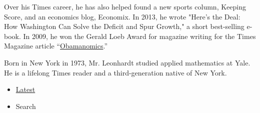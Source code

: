 Over his Times career, he has also helped found a new sports column,
Keeping Score, and an economics blog, Economix. In 2013, he wrote
"Here's the Deal: How Washington Can Solve the Deficit and Spur Growth,"
a short best-selling e-book. In 2009, he won the Gerald Loeb Award for
magazine writing for the Times Magazine article
``\href{https://www.nytimes3xbfgragh.onion/2008/08/24/magazine/24Obamanomics-t.html}{Obamanomics}.''

Born in New York in 1973, Mr. Leonhardt studied applied mathematics at
Yale. He is a lifelong Times reader and a third-generation native of New
York.

\begin{itemize}
\tightlist
\item
  \protect\hyperlink{stream-panel}{Latest}
\item
  Search
\end{itemize}

